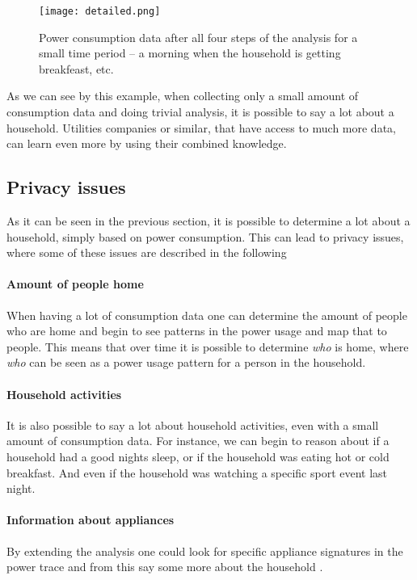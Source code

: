 \begin{figure}
  \begin{center}
    \texttt{[image: detailed.png]}
  \end{center}
  \caption{Power consumption data after all four steps of the analysis for a small time period -- a morning when the household is getting breakfeast, etc.}
  \label{detailed_consumption}
\end{figure}

As we can see by this example, when collecting only a small amount of consumption data and doing trivial analysis, it is possible to say a lot about a household.
Utilities companies or similar, that have access to much more data, can learn even more by using their combined knowledge. 

\subsection{Privacy issues}\label{privacy_concerns}
As it can be seen in the previous section, it is possible to determine a lot about a household, simply based on power consumption.
This can lead to privacy issues, where some of these issues are described in the following

\paragraph{Amount of people home}
When having a lot of consumption data one can determine the amount of people who are home and begin to see patterns in the power usage and map that to people.
This means that over time it is possible to determine \textit{who} is home, where \textit{who} can be seen as a power usage pattern for a person in the household.

\paragraph{Household activities}
  
It is also possible to say a lot about household activities, even with a small amount of consumption data.
For instance, we can begin to reason about if a household had a good nights sleep, or if the household was eating hot or cold breakfast.
And even if the household was watching a specific sport event last night.
\paragraph{Information about appliances}
By extending the analysis one could look for specific appliance signatures in the power trace and from this say some more about the household \cite{NILM}.
